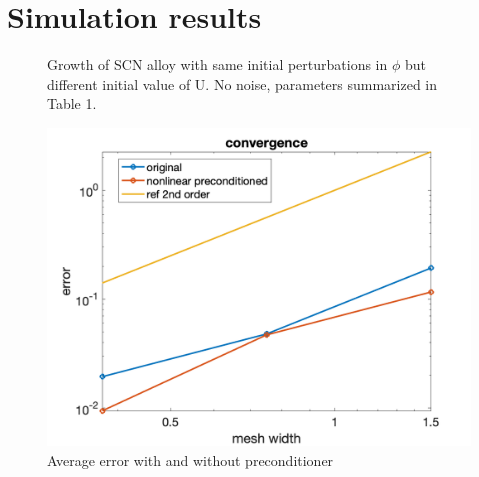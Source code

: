 \documentclass[a4paper,12pt]{article}
\begin{document}
\section{Simulation results}

 \begin{figure}[!ht]
     \hfill
      \hfill
      \hfill
          
     
     \caption{Growth of SCN alloy with same initial perturbations in $\phi$ but different initial value of U. No noise, parameters summarized in Table 1.}
     \label{fig:Ech}
   \end{figure}

\begin{figure}[h]
\centering
\includegraphics[width=0.5\linewidth]{./figures/preconditioner.png}
\caption{Average error with and without preconditioner}
\end{figure}
   







\end{document}
